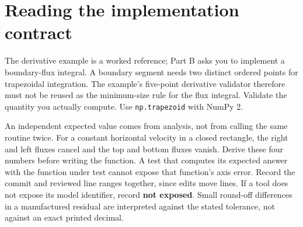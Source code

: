 \section*{Reading the implementation contract}
The derivative example is a worked reference; Part B asks you to implement a
boundary-flux integral. A boundary segment needs two distinct ordered points for
trapezoidal integration. The example's five-point derivative validator therefore
must not be reused as the minimum-size rule for the flux integral. Validate the
quantity you actually compute. Use \texttt{np.trapezoid} with NumPy 2.

An independent expected value comes from analysis, not from calling the same
routine twice. For a constant horizontal velocity in a closed rectangle, the
right and left fluxes cancel and the top and bottom fluxes vanish. Derive these
four numbers before writing the function. A test that computes its expected
answer with the function under test cannot expose that function's axis error.
Record the commit and reviewed line ranges together, since edits move lines.
If a tool does not expose its model identifier, record \textbf{not exposed}. Small
round-off differences in a manufactured residual are interpreted against the
stated tolerance, not against an exact printed decimal.
